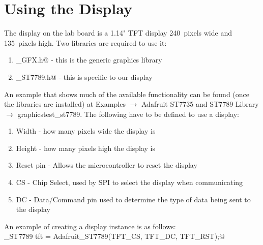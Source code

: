 \section{Using the Display}
The display on the lab board is a 1.14" TFT display 240~pixels wide and 135~pixels high. 
Two libraries are required to use it:
\begin{enumerate}
	\item \lstinline@Adafruit_GFX.h@ - this is the generic graphics library
	\item \lstinline@Adafruit_ST7789.h@ - this is specific to our display
\end{enumerate}
An example that shows much of the available functionality can be found (once the libraries are installed)
at Examples $\rightarrow$ Adafruit ST7735 and ST7789 Library $\rightarrow$ graphicstest\_st7789. 
The following have to be defined to use a display:
\begin{enumerate}
	\item Width - how many pixels wide the display is 
	\item Height - how many pixels high the display is 
	\item Reset pin - Allows the microcontroller to reset the display
	\item CS - Chip Select, used by SPI to select the display when communicating
	\item DC - Data/Command pin used to determine the type of data being sent to the display
\end{enumerate}

An example of creating a display instance is as follows:\\
\lstinline@Adafruit_ST7789 tft = Adafruit_ST7789(TFT_CS, TFT_DC, TFT_RST);@

